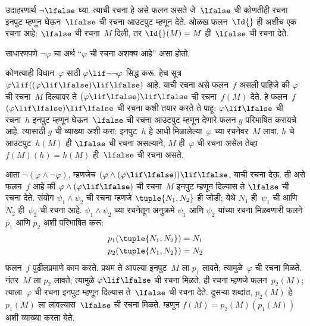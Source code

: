 \begin{ex}
उदाहरणार्थ $\lnot \lfalse$ घ्या. त्याची रचना हे
असे फलन असते जे~$\lfalse$ ची कोणतीही रचना इनपुट
म्हणून घेऊन~$\lfalse$ ची रचना आउटपुट म्हणून देते.
ओळख फलन~$\Id{}$ ही अशीच एक रचना आहे:
$\lfalse$ ची रचना~$M$ दिली, तर $\Id{}(M) = M$
ही~$\lfalse$ ची रचना देते.
\end{ex}

साधारणपणे $\lnot \varphi$ चा अर्थ ``$\varphi$ ची रचना अशक्य आहे'' असा होतो.

\begin{ex}
कोणत्याही विधान~$\varphi$ साठी $\varphi \lif \lnot \lnot \varphi$
सिद्ध करू. हेच सूत्र $\varphi \lif ((\varphi \lif \lfalse) \lif
\lfalse)$ आहे. याची रचना असे फलन~$f$ असली पाहिजे
की $\varphi$ ची रचना~$M$ दिल्यावर ते $(\varphi \lif \lfalse)
\lif \lfalse$ ची रचना~$f(M)$ देते. हे फलन~$f$
$(\varphi \lif \lfalse) \lif \lfalse$ ची रचना कशी
तयार करते ते पाहू: $\varphi \lif \lfalse$
ची रचना~$h$ इनपुट म्हणून घेऊन~$\lfalse$ ची रचना
आउटपुट म्हणून देणारे फलन $g$ परिभाषित करायचे आहे.
त्यासाठी $g$ ची व्याख्या अशी करा: इनपुट~$h$ हे
आधी मिळालेल्या~$\varphi$ च्या
रचनेवर~$M$ लावा. $h$ चे आउटपुट~$h(M)$ ही
$\lfalse$ ची रचना असल्याने, $M$ ही~$\varphi$ ची रचना
असेल तेव्हा $f(M)(h) = h(M)$ ही~$\lfalse$ ची रचना
असते.
\end{ex}

\begin{ex}
आता $\lnot(\varphi \land \lnot \varphi)$, म्हणजेच $(\varphi
\land (\varphi \lif \lfalse)) \lif \lfalse$, याची रचना
देऊ. ती असे फलन~$f$ आहे की $\varphi \land (\varphi \lif
\lfalse)$ ची रचना~$M$ इनपुट म्हणून दिल्यास ते
$\lfalse$ ची रचना देते. संयोग $\psi_1 \land \psi_2$
ची रचना म्हणजे $\tuple{N_1, N_2}$ ही जोडी; येथे
$N_1$ ही~$\psi_1$ ची आणि $N_2$ ही~$\psi_2$ ची
रचना आहे. $\psi_1 \land \psi_2$ च्या रचनेतून
अनुक्रमे $\psi_1$ आणि $\psi_2$ यांच्या रचना मिळवणारी
फलने $p_1$ आणि $p_2$ अशी परिभाषित करू:
\begin{align*}
  p_1(\tuple{N_1, N_2}) &= N_1\\
  p_2(\tuple{N_1, N_2}) &= N_2
\end{align*}
फलन~$f$ पुढीलप्रमाणे काम करते. प्रथम ते आपल्या
इनपुट~$M$ ला $p_1$ लावते; त्यामुळे~$\varphi$ ची रचना
मिळते. नंतर~$M$ ला $p_2$ लावते; त्यामुळे
$\varphi \lif \lfalse$ ची रचना मिळते. ही रचना म्हणजे
फलन~$p_2(M)$; त्याला~$\varphi$ ची रचना इनपुट म्हणून
दिल्यास ते~$\lfalse$ ची रचना देते. दुसऱ्या शब्दांत,
$p_2(M)$ हे $p_1(M)$ ला लावल्यास~$\lfalse$ ची
रचना मिळते. म्हणून $f(M) = p_2(M)(p_1(M))$ अशी
व्याख्या करता येते.
\end{ex}

